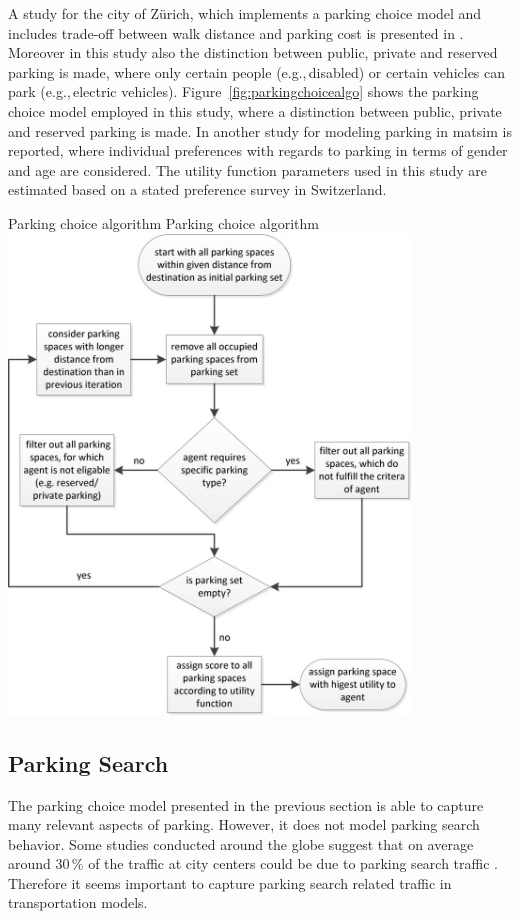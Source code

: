 A study for the city of Zürich, which implements a parking choice model and includes trade-off between walk distance and parking cost is presented in \citet[][]{WaraichAxhausen_TRR_2012}. Moreover in this study also the distinction between public, private and reserved parking is made, where only certain people (e.g.,\,disabled) or certain vehicles can park (e.g.,\,electric vehicles). Figure~\ref{fig:parkingchoicealgo} shows the parking choice model employed in this study, where a distinction between public, private and reserved parking is made. In \citet[][]{WaraichEtAl_unpub_TRB_2013} another study for modeling parking in \gls{matsim} is reported, where individual preferences with regards to parking in terms of gender and age are considered. The utility function parameters used in this study are estimated based on a stated preference survey in Switzerland.

\createfigure%
{Parking choice algorithm}%
{Parking choice algorithm}%
{\label{fig:parkingchoicealgo}}%
{\includegraphics[width=0.8\textwidth, angle=0]{extending/figures/Parking/parking_algo.png}}%
{\citet[][]{WaraichAxhausen_TRR_2012}}

\subsection{Parking Search}
The parking choice model presented in the previous section is able to capture many relevant aspects of parking. However, it does not model parking search behavior. Some studies conducted around the globe suggest that on average around 30\,\% of the traffic at city centers could be due to parking search traffic \citet[][]{Shoup_RSUE_2004}. Therefore it seems important to capture parking search related traffic in transportation models.

